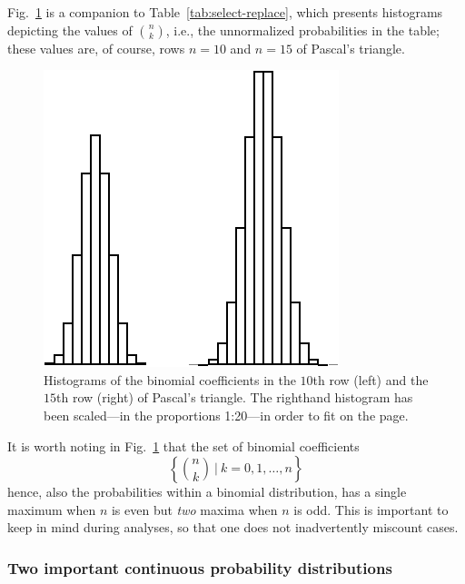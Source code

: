 Fig.~\ref{fig:gaussiandistribution} is a companion to Table~\ref{tab:select-replace}, which presents histograms depicting the values of $\displaystyle {n \choose k}$, i.e., the unnormalized probabilities in the table; these values are, of course, rows $n =10$ and $n=15$ of Pascal's triangle.
\begin{figure}[htb]
\begin{center}
        \includegraphics[scale=0.5]{FiguresMaths/ProbaGaussianDistribution}
        \caption{Histograms of the binomial coefficients in the $10$th row (left) and the $15$th row (right) of Pascal's triangle.  The righthand histogram has been scaled---in the proportions 1:20---in order to fit on the page.}
        \label{fig:gaussiandistribution}
\end{center}
\end{figure}

It is worth noting in Fig.~\ref{fig:gaussiandistribution} that the set of binomial coefficients
\[ \left\{ {n \choose k} \ | \ k = 0, 1, \ldots, n \right\} \]
hence, also the probabilities within a binomial distribution, has a single maximum when $n$ is even but {\em two} maxima when $n$ is odd.  This is important to keep in mind during analyses, so that one does not inadvertently miscount cases.


\subsubsection{Two important continuous probability distributions}
\label{sec:normal-expon-distr}

  
 

